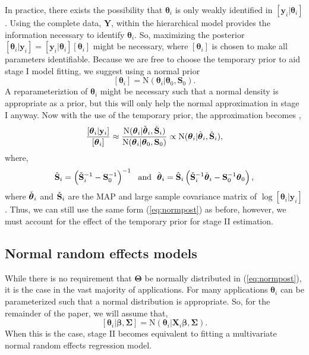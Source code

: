\documentclass[12pt]{article}
\newcommand{\by}{\mathbf{y}}
\newcommand{\bt}{\boldsymbol{\theta}}
\newcommand{\bb}{\boldsymbol{\beta}}
\newcommand{\bT}{\boldsymbol{\Theta}}
\newcommand{\bSig}{\boldsymbol{\Sigma}}
\newcommand{\bS}{\mathbf{S}}
\newcommand{\bX}{\mathbf{X}}
\newcommand{\bY}{\mathbf{Y}}
\begin{document}
In practice, there exists the possibility that $\bt_i$ is only weakly identified in $[\by_i|\bt_i]$. Using the complete data, $\bY$, within the hierarchical model provides the information necessary to identify $\bt_i$. So, maximizing the posterior $[\bt_i|\by_i] = [\by_i|\bt_i][\bt_i]$ might be necessary, where $[\bt_i]$ is chosen to make all parameters identifiable. Because we are free to choose the temporary prior to aid stage I model fitting, we suggest using a normal prior
\[
[\bt_i] = \text{N}(\bt_i|\bt_0, \bS_0).
\]
A reparameteriztion of $\bt_i$ might be necessary such that a normal density is appropriate as a prior, but this will only help the normal approximation in stage I anyway. Now with the use of the temporary prior, the approximation becomes \citep{goudie2019joining},
\begin{equation}
\label{eq:pseudo.prior}
\frac{[\bt_i|\by_i]}{[\bt_i]} \approx \frac{\text{N}(\bt_i|\Check{\bt}_i, \Check{\bS}_i)}{\text{N}(\bt_i|\bt_0, \bS_0)} \propto \text{N}(\bt_i|\hat{\bt}_i, \hat{\bS}_i),
\end{equation}
where,
\begin{equation}
\label{eq:pprior.remove}
\hat{\bS}_i = \left(\Check{\bS}_i^{-1} - \bS_0^{-1}\right)^{-1} 
\ \ \text{and}\ \ 
\hat{\bt}_i = \hat{\bS}_i \left(  \Check{\bS}_i^{-1}\Check{\bt}_i -  \bS_0^{-1}\bt_0\right),
\end{equation}
where $\Check{\bt}_i$ and $\Check{\bS}_i$ are the MAP and large sample covariance matrix of $\log [\bt_i|\by_i]$. Thus, we can still use the same form (\ref{eq:normpost}) as before, however, we must account for the effect of the temporary prior for stage II estimation. 


\subsection{Normal random effects models}

While there is no requirement that $\bT$ be normally distributed in (\ref{eq:normpost}), it is the case in the vast majority of applications. For many applications $\bt_i$ can be parameterized such that a normal distribution is appropriate. So, for the remainder of the paper, we will assume that, 
\[
[\bt_i|\bb, \bSig] = \text{N}(\bt_i|\bX_i\bb, \bSig).
\]
When this is the case, stage II becomes equivalent to fitting a multivariate normal random effects regression model. 
\end{document}
